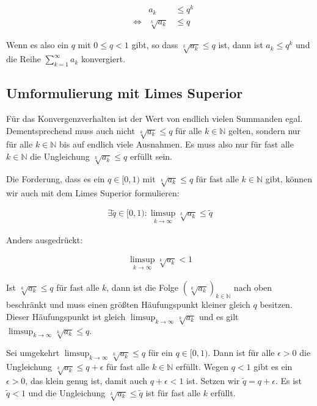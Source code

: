 \documentclass[fontsize=9pt,
               parskip=half-,
               DIV=14,
               listof=chapterentry,
               tocflat]{scrbook}
\begin{document}
\begin{align*}
&&a_{k}&\leq q^{k}\\&\iff &{\sqrt[{k}]{a_{k}}}&\leq q
\end{align*}

Wenn es also ein $q$ mit $0\leq q<1$ gibt, so dass ${\sqrt[{k}]{a_{k}}}\leq q$ ist, dann ist $a_{k}\leq q^{k}$ und die Reihe $\sum _{k=1}^{\infty }a_{k}$ konvergiert.

\subsection{Umformulierung mit Limes Superior}

Für das Konvergenzverhalten ist der Wert von endlich vielen Summanden egal. Dementsprechend muss auch nicht ${\sqrt[{k}]{a_{k}}}\leq q$ für alle $k\in \mathbb {N} $ gelten, sondern nur für alle $k\in \mathbb {N} $ bis auf endlich viele Ausnahmen. Es muss also nur für fast alle $k\in \mathbb {N} $ die Ungleichung ${\sqrt[{k}]{a_{k}}}\leq q$ erfüllt sein.

Die Forderung, dass es ein $q\in [0,1)$ mit ${\sqrt[{k}]{a_{k}}}\leq q$ für fast alle $k\in \mathbb {N} $ gibt, können wir auch mit dem Limes Superior formulieren:

\begin{align*}
\exists {\tilde {q}}\in [0,1):\limsup _{k\to \infty }{\sqrt[{k}]{a_{k}}}\leq {\tilde {q}}
\end{align*}

Anders ausgedrückt:

\begin{align*}
\limsup _{k\to \infty }{\sqrt[{k}]{a_{k}}}<1
\end{align*}

Ist ${\sqrt[{k}]{a_{k}}}\leq q$ für fast alle $k$, dann ist die Folge $\left({\sqrt[{k}]{a_{k}}}\right)_{k\in \mathbb {N} }$ nach oben beschränkt und muss einen größten Häufungspunkt kleiner gleich $q$ besitzen. Dieser Häufungspunkt ist gleich $\limsup _{k\to \infty }{\sqrt[{k}]{a_{k}}}$ und es gilt $\limsup _{k\to \infty }{\sqrt[{k}]{a_{k}}}\leq q$.

Sei umgekehrt $\limsup _{k\to \infty }{\sqrt[{k}]{a_{k}}}\leq q$ für ein $q\in [0,1)$. Dann ist für alle $\epsilon >0$ die Ungleichung ${\sqrt[{k}]{a_{k}}}\leq q+\epsilon $ für fast alle $k\in \mathbb {N} $ erfüllt. Wegen $q<1$ gibt es ein $\epsilon >0$, das klein genug ist, damit auch $q+\epsilon <1$ ist. Setzen wir ${\tilde {q}}=q+\epsilon $. Es ist ${\tilde {q}}<1$ und die Ungleichung ${\sqrt[{k}]{a_{k}}}\leq {\tilde {q}}$ ist für fast alle $k$ erfüllt.
\end{document}
